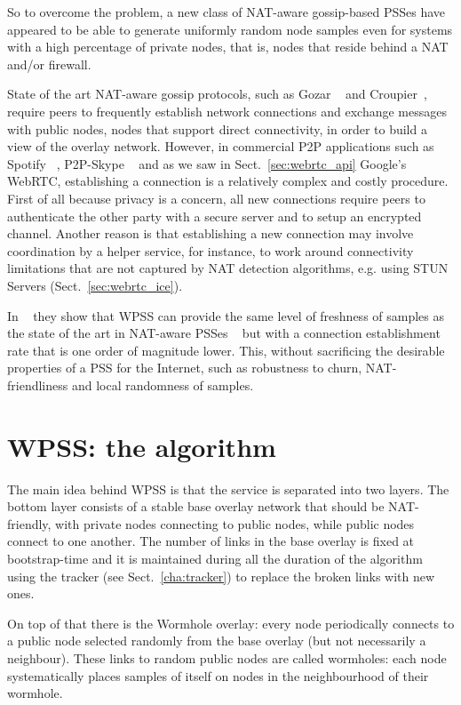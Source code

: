 So to overcome the problem, a new class of NAT-aware gossip-based PSSes have appeared to be able to generate uniformly random node samples even for systems with a high percentage of private nodes, that is, nodes that reside behind a NAT and/or firewall.

State of the art NAT-aware gossip protocols, such as Gozar ~\cite{gozar} and Croupier~\cite{croupier}, require peers to frequently establish network connections and exchange messages with public nodes, nodes that support direct connectivity, in order to build a view of the overlay network. However, in commercial P2P applications such as Spotify ~\cite{spotify}, P2P-Skype ~\cite{skype} and as we saw in Sect.~\ref{sec:webrtc_api} Google’s WebRTC, establishing a connection is a relatively complex and costly procedure. First of all because privacy is a concern, all new connections require peers to authenticate the other party with a secure server and to setup an encrypted channel. Another reason is that establishing a new connection may involve coordination by a helper service, for instance, to work around connectivity limitations that are not captured by NAT detection algorithms, e.g. using STUN Servers (Sect.~\ref{sec:webrtc_ice}). 

In ~\cite{wormhole} they show that \ac{WPSS} can provide the same level of freshness of samples as the state of the art in NAT-aware PSSes ~\cite{croupier} but with a connection establishment rate that is one order of magnitude lower. This, without sacrificing the desirable properties of a PSS for the Internet, such as robustness to churn, NAT-friendliness and local randomness of samples.

\section{WPSS: the algorithm}
\label{sec:wpss_algorithm}
The main idea behind \ac{WPSS} is that the service is separated into two layers. The bottom layer consists of a stable base overlay network that should be NAT-friendly, with private nodes connecting to public nodes, while public nodes connect to one another. The number of links in the base overlay is fixed at bootstrap-time and it is maintained during all the duration of the algorithm using the tracker (see Sect.~\ref{cha:tracker}) to replace the broken links with new ones.

On top of that there is the Wormhole overlay: every node periodically connects to a public node selected randomly from the base overlay (but not necessarily a neighbour). These links to random public nodes are called wormholes: each node systematically places samples of itself on nodes in the neighbourhood of their wormhole. 

